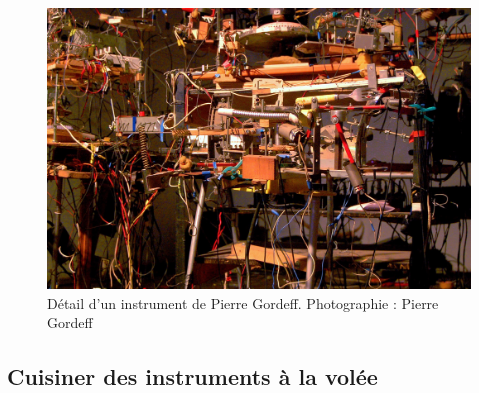 \begin{figure}[!htbp]
	\captionsetup{format=plain}%
	\includegraphics[width=\textwidth]{gfx/02_ephemeral/PierreGordeff.jpg}
	\caption[Détail d'un instrument de Pierre Gordeff]{Détail d'un instrument de Pierre Gordeff. Photographie : Pierre Gordeff}
	\label{fig:ephemeral:Gordeff}
\end{figure}

\subsection{Cuisiner des instruments à la volée}

